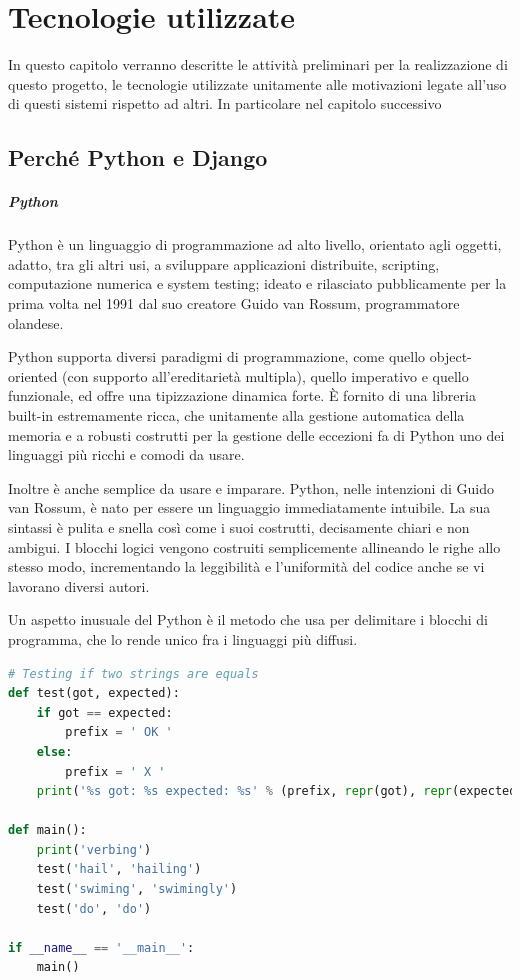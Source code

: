 \chapter{Tecnologie utilizzate}
In questo capitolo verranno descritte le attività preliminari per la realizzazione di questo progetto, le tecnologie utilizzate
unitamente alle motivazioni legate all'uso di questi sistemi rispetto ad altri. In particolare nel capitolo successivo 


\section{Perché Python e Django}
\paragraph{Python}
Python è un linguaggio di programmazione ad alto livello, orientato agli oggetti, adatto, tra gli altri usi, a sviluppare applicazioni 
distribuite, scripting, computazione numerica e system testing; ideato e rilasciato pubblicamente per la prima volta nel 1991 dal suo 
creatore Guido van Rossum, programmatore olandese.

Python supporta diversi paradigmi di programmazione, come quello object-oriented (con supporto all'ereditarietà multipla), quello 
imperativo e quello funzionale, ed offre una tipizzazione dinamica forte. È fornito di una libreria built-in estremamente ricca, che 
unitamente alla gestione automatica della memoria e a robusti costrutti per la gestione delle eccezioni fa di Python uno dei linguaggi 
più ricchi e comodi da usare.

Inoltre è anche semplice da usare e imparare. Python, nelle intenzioni di Guido van Rossum, è nato per essere un linguaggio 
immediatamente intuibile. La sua sintassi è pulita e snella così come i suoi costrutti, decisamente chiari e non ambigui. I blocchi 
logici vengono costruiti semplicemente allineando le righe allo stesso modo, incrementando la leggibilità e l'uniformità del codice 
anche se vi lavorano diversi autori.

Un aspetto inusuale del Python è il metodo che usa per delimitare i blocchi di programma, che lo rende unico fra i linguaggi più diffusi.

\lstset{style=python_code_style}
\begin{lstlisting}[language=Python, caption={Esempio di programma in Python}]
# Testing if two strings are equals
def test(got, expected):
	if got == expected:
		prefix = ' OK '
	else:
		prefix = ' X '
	print('%s got: %s expected: %s' % (prefix, repr(got), repr(expected)))

def main():
	print('verbing')
	test('hail', 'hailing')
	test('swiming', 'swimingly')
	test('do', 'do')

if __name__ == '__main__':
	main()
\end{lstlisting}

